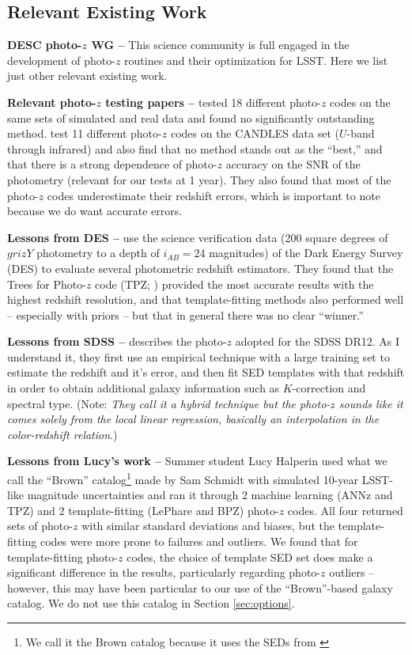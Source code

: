\documentclass[DM,lsstdraft,toc]{lsstdoc}
\begin{document}
\subsection{Relevant Existing Work}\label{ssec:options_lit}

\textbf{DESC photo-$z$ WG --} This science community is full engaged in the development of photo-$z$ routines and their optimization for LSST. Here we list just other relevant existing work.

\textbf{Relevant photo-$z$ testing papers --} \cite{2010A&A...523A..31H} tested 18 different photo-$z$ codes on the same sets of simulated and real data and found no significantly outstanding method. \cite{2013ApJ...775...93D} test 11 different photo-$z$ codes on the CANDLES data set ($U$-band through infrared) and also find that no method stands out as the ``best,'' and that there is a strong dependence of photo-$z$ accuracy on the SNR of the photometry (relevant for our tests at 1 year). They also found that most of the photo-$z$ codes underestimate their redshift errors, which is important to note because we do want accurate errors.

\textbf{Lessons from DES --} \cite{2014MNRAS.445.1482S} use the science verification data (200 square degrees of $grizY$ photometry to a depth of $i_{AB}=24$ magnitudes) of the Dark Energy Survey (DES) to evaluate several photometric redshift estimators. They found that the Trees for Photo-$z$ code (TPZ; \citealt{2013ascl.soft04011C}) provided the most accurate results with the highest redshift resolution, and that template-fitting methods also performed well -- especially with priors -- but that in general there was no clear ``winner.''

\textbf{Lessons from SDSS --} \cite{2016MNRAS.460.1371B} describes the photo-$z$ adopted for the SDSS DR12. As I understand it, they first use an empirical technique with a large training set to estimate the redshift and it's error, and then fit SED templates with that redshift in order to obtain additional galaxy information such as $K$-correction and spectral type. (Note: \textit{They call it a hybrid technique but the photo-$z$ sounds like it comes solely from the local linear regression, basically an interpolation in the color-redshift relation}.)

\textbf{Lessons from Lucy's work --} Summer student Lucy Halperin used what we call the ``Brown'' catalog\footnote{We call it the Brown catalog because it uses the SEDs from \cite{2014ApJS..212...18B}} made by Sam Schmidt with simulated 10-year LSST-like magnitude uncertainties and ran it through 2 machine learning (ANNz and TPZ) and 2 template-fitting (LePhare and BPZ) photo-$z$ codes. All four returned sets of photo-$z$ with similar standard deviations and biases, but the template-fitting codes were more prone to failures and outliers. We found that for template-fitting photo-$z$ codes, the choice of template SED set does make a significant difference in the results, particularly regarding photo-$z$ outliers -- however, this may have been particular to our use of the ``Brown''-based galaxy catalog. We do not use this catalog in Section \ref{sec:options}.
\end{document}
